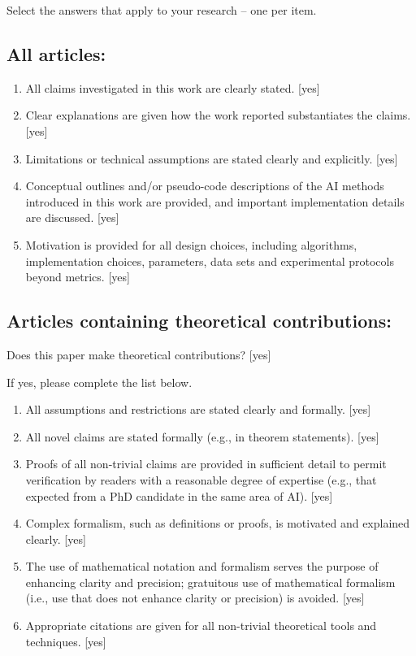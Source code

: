 \documentclass[review]{jair}
\begin{document}
Select the answers that apply to your research -- one per item. 

\subsection*{All articles:}

\begin{enumerate}
    \item All claims investigated in this work are clearly stated. 
    [yes]
    \item Clear explanations are given how the work reported substantiates the claims. 
    [yes]
    \item Limitations or technical assumptions are stated clearly and explicitly. 
    [yes]
    \item Conceptual outlines and/or pseudo-code descriptions of the AI methods introduced in this work are provided, and important implementation details are discussed. 
    [yes]
    \item 
    Motivation is provided for all design choices, including algorithms, implementation choices, parameters, data sets and experimental protocols beyond metrics.
    [yes]
\end{enumerate}

\subsection*{Articles containing theoretical contributions:}
Does this paper make theoretical contributions? 
[yes] 

If yes, please complete the list below.

\begin{enumerate}
    \item All assumptions and restrictions are stated clearly and formally. 
    [yes]
    \item All novel claims are stated formally (e.g., in theorem statements). 
    [yes]
    \item Proofs of all non-trivial claims are provided in sufficient detail to permit verification by readers with a reasonable degree of expertise (e.g., that expected from a PhD candidate in the same area of AI). [yes]
    \item
    Complex formalism, such as definitions or proofs, is motivated and explained clearly.
    [yes]
    \item 
    The use of mathematical notation and formalism serves the purpose of enhancing clarity and precision; gratuitous use of mathematical formalism (i.e., use that does not enhance clarity or precision) is avoided.
    [yes]
    \item 
    Appropriate citations are given for all non-trivial theoretical tools and techniques. 
    [yes]
\end{enumerate}
\end{document}
